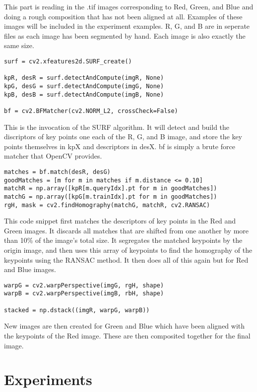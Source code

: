 \documentclass[10pt]{IEEEtran}
\begin{document}
This part is reading in the .tif images corresponding to Red, Green, and Blue and doing a rough composition that has not been aligned at all. Examples of these images will be included in the experiment examples. R, G, and B are in seperate files as each image has been segmented by hand. Each image is also exactly the same size. 

\begin{lstlisting}
surf = cv2.xfeatures2d.SURF_create()

kpR, desR = surf.detectAndCompute(imgR, None)
kpG, desG = surf.detectAndCompute(imgG, None)
kpB, desB = surf.detectAndCompute(imgB, None)

bf = cv2.BFMatcher(cv2.NORM_L2, crossCheck=False)
\end{lstlisting}

This is the invocation of the SURF algorithm. It will detect and build the discriptors of key points one each of the R, G, and B image, and store the key points themselves in kpX and descriptors in desX. bf is simply a brute force matcher that OpenCV provides. 

\begin{lstlisting}
matches = bf.match(desR, desG)
goodMatches = [m for m in matches if m.distance <= 0.10]
matchR = np.array([kpR[m.queryIdx].pt for m in goodMatches])
matchG = np.array([kpG[m.trainIdx].pt for m in goodMatches])
rgH, mask = cv2.findHomography(matchG, matchR, cv2.RANSAC)
\end{lstlisting}

This code snippet first matches the descriptors of key points in the Red and Green images. It discards all matches that are shifted from one another by more than 10\% of the image's total size. It segregates the matched keypoints by the origin image, and then uses this array of keypoints to find the homography of the keypoints using the RANSAC method. It then does all of this again but for Red and Blue images.  

\begin{lstlisting}
warpG = cv2.warpPerspective(imgG, rgH, shape)
warpB = cv2.warpPerspective(imgB, rbH, shape)

stacked = np.dstack((imgR, warpG, warpB))
\end{lstlisting}

New images are then created for Green and Blue which have been aligned with the keypoints of the Red image. These are then composited together for the final image. 

\section{Experiments}
\end{document}
